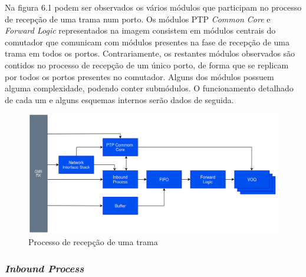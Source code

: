 Na figura 6.1 podem ser observados os vários módulos que participam no processo de recepção de uma trama num porto. Os módulos PTP \textit{Common Core} e \textit{Forward Logic} representados na imagem consistem em módulos centrais do comutador que comunicam com módulos presentes na fase de recepção de uma trama em todos os portos. Contrariamente, os restantes módulos observados são contidos no processo de recepção de um único porto, de forma que se replicam por todos os portos presentes no comutador. Alguns dos módulos possuem alguma complexidade, podendo conter submódulos. O funcionamento detalhado de cada um e alguns esquemas internos serão dados de seguida.  

\begin{figure}[H]
  \centering
  \includegraphics[width=1\textwidth]{FrameInbound.png}
  \caption[Processo de recepção de uma trama]{Processo de recepção de uma trama}
  \label{fig:airbus1}
\end{figure} 


\subsubsection{\textit{Inbound Process}}

